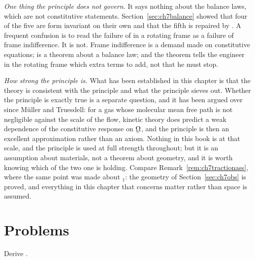 \begin{remark}
\emph{One thing the principle does not govern.} It says nothing about
the balance laws, which are not constitutive statements.
Section~\ref{sec:ch7balance} showed that four of the five are form
invariant on their own and that the fifth is repaired by . A
frequent confusion is to read the failure of  in a rotating
frame as a failure of frame indifference. It is not. Frame indifference
is a demand made on constitutive equations;  is a theorem about
a balance law; and the theorem tells the engineer in the rotating frame
which extra terms to add, not that he must stop.

\emph{How strong the principle is.} What has been established in this
chapter is that the theory is consistent with the principle and what the
principle sieves out. Whether the principle is exactly true is a separate
question, and it has been argued over since M\"uller and Truesdell: for a
gas whose molecular mean free path is not negligible against the scale of
the flow, kinetic theory does predict a weak dependence of the
constitutive response on $\bOm$, and the principle is then an excellent
approximation rather than an axiom. Nothing in this book is at that
scale, and the principle is used at full strength throughout; but it is
an assumption about materials, not a theorem about geometry, and it is
worth knowing which of the two one is holding. Compare
Remark~\ref{rem:ch7tractionass}, where the same point was made about
$_{1}$: the geometry of Section~\ref{sec:ch7obs} is proved, and
everything in this chapter that concerns matter rather than space is
assumed.
\end{remark}

\setcounter{problemenv}{0}
\section{Problems}\label{sec:problems:c7}

\begin{problem}
Derive .
\end{problem}

